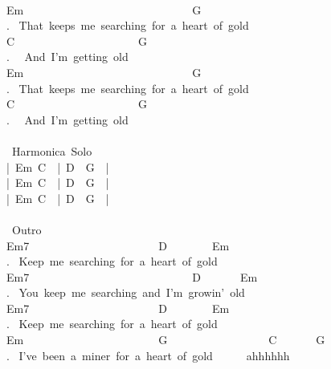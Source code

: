 {\\
Em\ \ \ \ \ \ \ \ \ \ \ \ \ \ \ \ \ \ \ \ \ \ \ \ \ \ \ \ \ \ G\\
. \ That\ keeps\ me\ searching\ for\ a\ heart\ of\ gold\\
C\ \ \ \ \ \ \ \ \ \ \ \ \ \ \ \ \ \ \ \ \ \ G\\
. \ \ And\ I'm\ getting\ old\\
Em\ \ \ \ \ \ \ \ \ \ \ \ \ \ \ \ \ \ \ \ \ \ \ \ \ \ \ \ \ \ G\\
. \ That\ keeps\ me\ searching\ for\ a\ heart\ of\ gold\\
C\ \ \ \ \ \ \ \ \ \ \ \ \ \ \ \ \ \ \ \ \ \ G\\
. \ \ And\ I'm\ getting\ old\\
\\
\lbrack\ Harmonica\ Solo\rbrack\\
|\ Em\ C\ \ |\ D\ \ G\ \ |\\
|\ Em\ C\ \ |\ D\ \ G\ \ |\\
|\ Em\ C\ \ |\ D\ \ G\ \ |\\
\\
\lbrack\ Outro\rbrack\\
Em7\ \ \ \ \ \ \ \ \ \ \ \ \ \ \ \ \ \ \ \ \ \ \ D\ \ \ \ \ \ \ \ Em\\
. \ Keep\ me\ searching\ for\ a\ heart\ of\ gold\\
Em7\ \ \ \ \ \ \ \ \ \ \ \ \ \ \ \ \ \ \ \ \ \ \ \ \ \ \ \ \ D\ \ \ \ \ \ \ Em\\
. \ You\ keep\ me\ searching\ and\ I'm\ growin'\ old\\
Em7\ \ \ \ \ \ \ \ \ \ \ \ \ \ \ \ \ \ \ \ \ \ \ D\ \ \ \ \ \ \ \ Em\\
. \ Keep\ me\ searching\ for\ a\ heart\ of\ gold\\
Em\ \ \ \ \ \ \ \ \ \ \ \ \ \ \ \ \ \ \ \ \ \ \ \ G\ \ \ \ \ \ \ \ \ \ \ \ \ \ \ \ \ \ C\ \ \ \ \ \ \ G\\
. \ I've\ been\ a\ miner\ for\ a\ heart\ of\ gold\ \ \ \ \ \ ahhhhhh\\}
